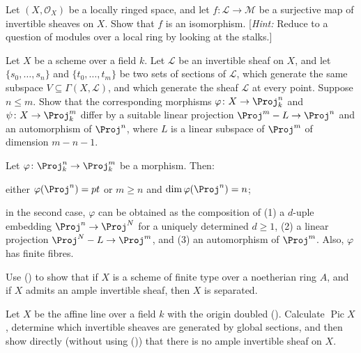 {\Exercises
{\fontsize{9}{10.5}\selectfont
\begin{description}[style=multiline,labelwidth=1.8em,leftmargin=2.1em,itemsep=4pt,topsep=2pt,parsep=0pt]
\item[\hypertarget{ex-II-7.1}{}7.1.] Let $(X,\mathcal O_X)$ be a locally ringed space, and let $f\colon\mathcal L\to\mathcal M$ be a surjective map of invertible sheaves on $X$. Show that $f$ is an isomorphism. [\emph{Hint:} Reduce to a question of modules over a local ring by looking at the stalks.]
\item[\hypertarget{ex-II-7.2}{}7.2.] Let $X$ be a scheme over a field $k$. Let $\mathcal L$ be an invertible sheaf on $X$, and let $\{s_0,\ldots,s_n\}$ and $\{t_0,\ldots,t_m\}$ be two sets of sections of $\mathcal L$, which generate the same subspace $V\subseteq\Gamma(X,\mathcal L)$, and which generate the sheaf $\mathcal L$ at every point. Suppose $n\le m$. Show that the corresponding morphisms $\varphi\colon X\to\Proj_k^n$ and $\psi\colon X\to\Proj_k^m$ differ by a suitable linear projection $\Proj^m-L\to\Proj^n$ and an automorphism of $\Proj^n$, where $L$ is a linear subspace of $\Proj^m$ of dimension $m-n-1$.
\item[\hypertarget{ex-II-7.3}{}7.3.] Let $\varphi\colon\Proj_k^n\to\Proj_k^m$ be a morphism. Then:
\begin{parts}
\item either $\varphi(\Proj^n)=pt$ or $m\ge n$ and $\dim\varphi(\Proj^n)=n$;
\item in the second case, $\varphi$ can be obtained as the composition of \hypertarget{cond-II-7.3-1}{}(1) a $d$-uple embedding $\Proj^n\to\Proj^N$ for a uniquely determined $d\ge 1$, \hypertarget{cond-II-7.3-2}{}(2) a linear projection $\Proj^N-L\to\Proj^m$, and \hypertarget{cond-II-7.3-3}{}(3) an automorphism of $\Proj^m$. Also, $\varphi$ has finite fibres.
\end{parts}
\item[\hypertarget{ex-II-7.4}{}7.4.]
\begin{parts}
\item[\hypertarget{ex-II-7.4a}{}(a)] Use () to show that if $X$ is a scheme of finite type over a noetherian ring $A$, and if $X$ admits an ample invertible sheaf, then $X$ is separated.
\item Let $X$ be the affine line over a field $k$ with the origin doubled (). Calculate $\operatorname{Pic} X$, determine which invertible sheaves are generated by global sections, and then show directly (without using ()) that there is no ample invertible sheaf on $X$.

\end{parts}
\end{description}}}
